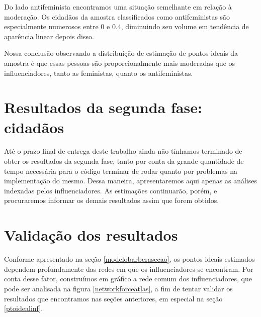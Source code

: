 \documentclass[
	12pt,				%
	openright,			%
	twoside,			%
	a4paper,			%
	english,			%
	brazil				%
	]{abntex2}
\begin{document}
 Do lado antifeminista encontramos uma situação semelhante em relação à moderação. Os cidadãos da amostra classificados como antifeministas são especialmente numerosos entre 0 e 0.4, diminuindo seu volume em tendência de aparência linear depois disso.
 
 Nossa conclusão observando a distribuição de estimação de pontos ideais da amostra é que essas pessoas são proporcionalmente mais moderadas que os influenciadores, tanto as feministas, quanto os antifeministas.
 
 \section{Resultados da segunda fase: cidadãos}
 Até o prazo final de entrega deste trabalho ainda não tínhamos terminado de obter os resultados da segunda fase, tanto por conta da grande quantidade de tempo necessária para o código terminar de rodar quanto por problemas na implementação do mesmo. Dessa maneira, apresentaremos aqui apenas as análises indexadas pelos influenciadores. As estimações continuarão, porém, e procuraremos informar os demais resultados assim que forem obtidos.
 
 \section{Validação dos resultados}\label{validacao}
 Conforme apresentado na seção \ref{modelobarberasecao}, os pontos ideais estimados dependem profundamente das redes em que os influenciadores se encontram. Por conta desse fator, construímos em gráfico a rede comum dos influenciadores, que pode ser analisada na figura \ref{networkforceatlas}, a fim de tentar validar os resultados que encontramos nas seções anteriores, em especial na seção \ref{ptoidealinf}.
 
\end{document}
